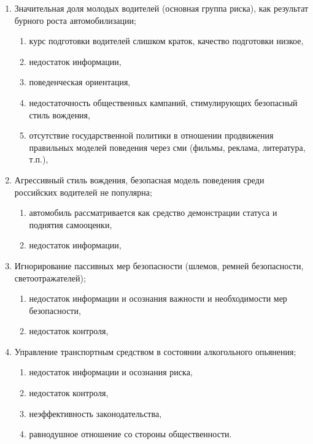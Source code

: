\begin{enumerate}
  \item Значительная доля молодых водителей (основная группа
        риска), как результат бурного роста автомобилизации;
    \begin{enumerate}
      \item курс подготовки водителей слишком краток, качество
            подготовки низкое,
      \item недостаток информации,
      \item поведенческая ориентация,
      \item недостаточность общественных кампаний, стимулирующих
            безопасный стиль вождения,
      \item отсутствие государственной политики в отношении
            продвижения правильных моделей поведения через сми
            (фильмы, реклама, литература, т.п.),
  \end{enumerate}

  \item Агрессивный стиль вождения, безопасная модель поведения
        среди российских водителей не популярна;
    \begin{enumerate}
      \item автомобиль рассматривается как средство демонстрации
            статуса и поднятия самооценки,
      \item недостаток информации,
  \end{enumerate}

  \item Игнорирование пассивных мер безопасности (шлемов, ремней
        безопасности, светоотражателей);
    \begin{enumerate}
      \item недостаток информации и осознания важности и
            необходимости мер безопасности,
      \item недостаток контроля,
  \end{enumerate}

  \item Управление транспортным средством в состоянии
        алкогольного опьянения;
    \begin{enumerate}
      \item недостаток информации и осознания риска,
      \item недостаток контроля,
      \item неэффективность законодательства,
      \item равнодушное отношение со стороны общественности.
  \end{enumerate}
\end{enumerate}

